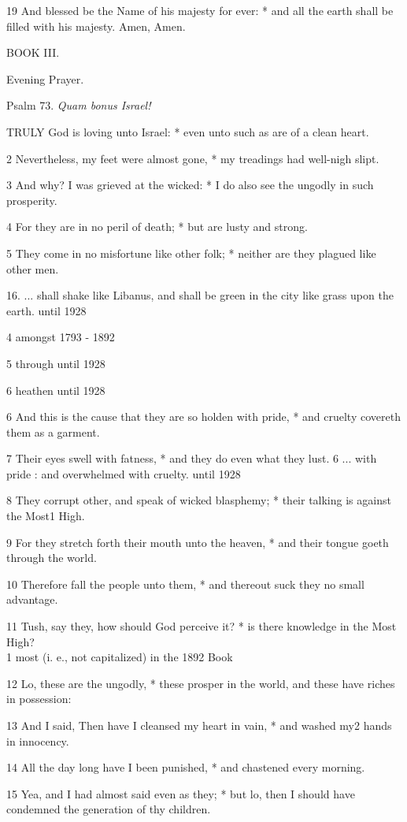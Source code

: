 19 And blessed be the Name of his majesty for ever:
* and all the earth shall be filled with his majesty. Amen, Amen.

BOOK
III. 

Evening Prayer.

Psalm
73. \emph{Quam bonus Israel!}

TRULY
God is loving unto Israel: * even unto such as are of a clean heart.

2 Nevertheless, my feet were almost gone, * my treadings
had well-nigh slipt.

3 And why? I was grieved at the wicked: * I do also
see the ungodly in such prosperity.

4 For they are in no peril of death; * but are lusty
and strong.

5 They come in no misfortune like other folk; * neither
are they plagued like other men.

16. ... shall shake like Libanus, and
shall be green in the city like grass upon the earth.
until 1928

4 amongst 1793
- 1892

5 through
until 1928 

6
heathen
until 1928

6 And this is the cause that they are so holden with pride, * and
cruelty covereth them as a garment.

7 Their eyes swell with fatness, * and they do even what
they lust. 6 ... with pride : and overwhelmed
with cruelty.
until 1928

8 They corrupt other, and speak of wicked blasphemy; * their talking is
against the Most1 High.

9 For they stretch forth their mouth unto the heaven,
* and their tongue goeth through the world.

10 Therefore fall the people unto them, * and thereout
suck they no small advantage.

11 Tush, say they, how should God perceive it? * is there
knowledge in the Most High? \\
1 most (i.
e., not capitalized) in the 1892 Book

12 Lo, these are the ungodly, * these prosper in the world, and these have
riches in possession:

13 And I said, Then have I cleansed my heart in vain,
* and washed my2 hands in innocency.

14 All the day long have I been punished, * and chastened
every morning.

15 Yea, and I had almost said even as they; * but lo,
then I should have condemned the generation of thy children.

